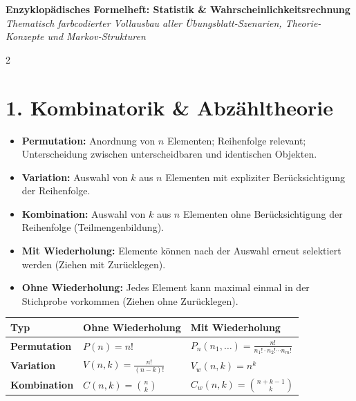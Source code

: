\documentclass[a4paper, 9pt]{extarticle}
\begin{document}
\begin{center}
    \textbf{\Large Enzyklopädisches Formelheft: Statistik \& Wahrscheinlichkeitsrechnung}\\[1pt]
    \textit{Thematisch farbcodierter Vollausbau aller Übungsblatt-Szenarien, Theorie-Konzepte und Markov-Strukturen}
\end{center}

\begin{multicols*}{2}

\section*{1. Kombinatorik \& Abzähltheorie}

\begin{tcolorbox}[title={Theorie-Stichworte: Kombinatorik}, colframe=combblue, colback=combblue!5, colbacktitle=combblue]
\begin{itemize}
    \item \textbf{Permutation:} Anordnung von $n$ Elementen; Reihenfolge relevant; Unterscheidung zwischen unterscheidbaren und identischen Objekten.
    \item \textbf{Variation:} Auswahl von $k$ aus $n$ Elementen mit expliziter Berücksichtigung der Reihenfolge.
    \item \textbf{Kombination:} Auswahl von $k$ aus $n$ Elementen ohne Berücksichtigung der Reihenfolge (Teilmengenbildung).
    \item \textbf{Mit Wiederholung:} Elemente können nach der Auswahl erneut selektiert werden (Ziehen mit Zurücklegen).
    \item \textbf{Ohne Wiederholung:} Jedes Element kann maximal einmal in der Stichprobe vorkommen (Ziehen ohne Zurücklegen).
\end{itemize}
\end{tcolorbox}

\begin{tcolorbox}[title={Kombinatorische Formelmatrix}, colframe=combblue, colback=combblue!5, colbacktitle=combblue]
\begin{tabularx}{\linewidth}{@{}lXX@{}}
\toprule
\textbf{Typ} & \textbf{Ohne Wiederholung} & \textbf{Mit Wiederholung} \\
\midrule
\textbf{Permutation} & $P(n) = n!$ & $P_{n}(n_1, \dots) = \frac{n!}{n_1! \cdot n_2! \cdots n_m!}$ \\
\midrule
\textbf{Variation} & $V(n,k) = \frac{n!}{(n-k)!}$ & $V_{w}(n,k) = n^k$ \\
\midrule
\textbf{Kombination} & $C(n,k) = \binom{n}{k}$ & $C_{w}(n,k) = \binom{n+k-1}{k}$ \\
\bottomrule
\end{tabularx}
\end{tcolorbox}


\end{multicols*}
\end{document}
